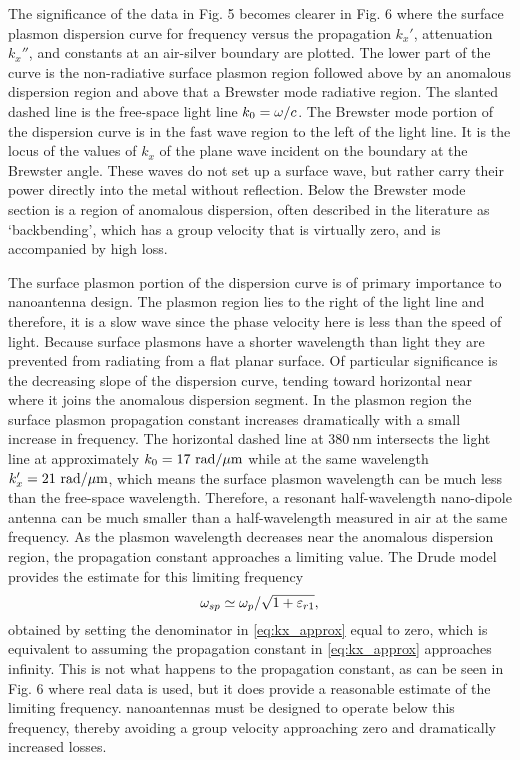 \documentclass[11pt]{article}
\begin{document}
The significance of the data in Fig. 5 becomes clearer in Fig. 6 where the surface plasmon dispersion curve for frequency versus the propagation $k_x'$, attenuation $k_x''$, and constants at an air-silver boundary are plotted. The lower part of the curve is the non-radiative surface plasmon region followed above by an anomalous dispersion region and above that a Brewster mode radiative region. The slanted dashed line is the free-space light line $k_0 = \omega/c$.  The Brewster mode portion of the dispersion curve is in the fast wave region to the left of the light line. It is the locus of the values of $k_x$  of the plane wave incident on the boundary at the Brewster angle. These waves do not set up a surface wave, but rather carry their power directly into the metal without reflection.  Below the Brewster mode section is a region of anomalous dispersion, often described in the literature as  `backbending', which has a group velocity that is virtually zero, and is accompanied by high loss.


The surface plasmon portion of the dispersion curve is of primary importance to nanoantenna design. The plasmon region lies to the right of the light line and therefore, it is a slow wave since the phase velocity here is less than the speed of light. Because surface plasmons have a shorter wavelength than light they are prevented from radiating from a flat planar surface. Of particular significance is the decreasing slope of the dispersion curve, tending toward horizontal near where it joins the anomalous dispersion segment. In the plasmon region the surface plasmon propagation constant increases dramatically with a small increase in frequency. The horizontal dashed line at $380~\mathrm{nm}$ intersects the light line at approximately $k_0 = 17~\mathrm{rad/{\mu m}}$ while at the same wavelength $k_x' = 21~\mathrm{rad/{\mu m}}$, which means the surface plasmon wavelength can be much less than the free-space wavelength. Therefore, a resonant half-wavelength nano-dipole antenna can be much smaller than a half-wavelength measured in air at the same frequency. As the plasmon wavelength decreases near the anomalous dispersion region, the propagation constant approaches a limiting value. The Drude model provides the estimate for this limiting frequency
%
\begin{equation}
  \omega_{sp} \simeq \omega_p/\sqrt{1 + \varepsilon_{r1}},
  \label{eq:apprx_plasma_freq}
\end{equation}
%
obtained by setting the denominator in \eqref{eq:kx_approx} equal to zero, which is equivalent to assuming the propagation constant in \eqref{eq:kx_approx} approaches infinity. This is not what happens to the propagation constant, as can be seen in Fig. 6 where real data is used, but it does provide a reasonable estimate of the limiting frequency. nanoantennas must be designed to operate below this frequency, thereby avoiding a group velocity approaching zero and dramatically increased losses.
\end{document}
